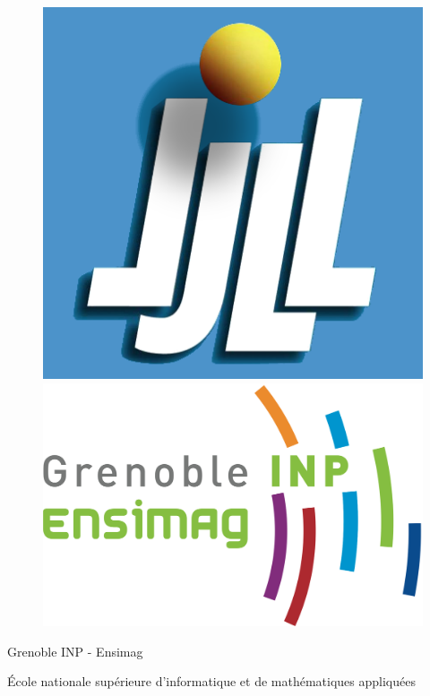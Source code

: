 \documentclass[12pt,a4paper]{report}
\newcommand{\translationLogo}{2cm}                                                                                                    %
\begin{document}
\begin{titlepage}
    \centering
    \begin{figure}[htp]
      \centering
      \hspace{\translationLogo}
      \includegraphics[scale=0.2]{images/logo.png}
      \hfill
      \includegraphics[scale=0.6]{images/logoEnsimag.png}
    \end{figure}

	\par\vspace{1cm}

	{\LARGE Grenoble INP - Ensimag\par}
	{\normalsize\'Ecole nationale sup\'erieure d'informatique et de math\'ematiques appliqu\'ees\par}


\end{titlepage}
\end{document}
